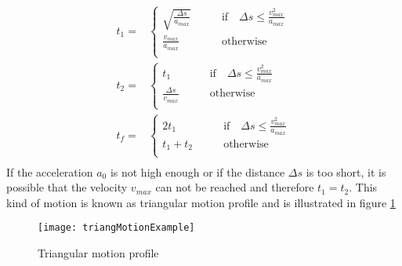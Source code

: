 \documentclass[a4paper, 11pt]{article}
\begin{document}
\newpage
\begin{equation}
\label{t1t2tf}
\begin{split}
t_1 =
&\begin{cases}
\sqrt{\frac{\Delta s}{a_{max}}}  \qquad &\textrm{if} \quad \Delta s \leq \frac{v_{max}^2}{a_{max}}\\[10pt]
\frac{v_{max}}{a_{max}}  \qquad &\textrm{otherwise} \\
\end{cases}\\
t_2 =
&\begin{cases}
t_1  \qquad &\textrm{if} \quad \Delta s \leq \frac{v_{max}^2}{a_{max}}\\[10pt]
\frac{\Delta s}{v_{max}}  \qquad &\textrm{otherwise} \\
\end{cases}\\
t_f =
&\begin{cases}
2t_1  \qquad &\textrm{if} \quad \Delta s \leq \frac{v_{max}^2}{a_{max}}\\[10pt]
t_1 + t_2   \qquad &\textrm{otherwise} \\
\end{cases}\\
\end{split}
\end{equation}
If the acceleration $a_0$ is not high enough or if the distance $\Delta s$ is too short, it is possible that the velocity $v_{max}$ can not be reached and therefore $t_1=t_2$. This kind of motion is known as triangular motion profile and is illustrated in figure \ref{fig:triangMotionExample}
\begin{figure}[H]
	\centering
	\texttt{[image: triangMotionExample]}
	\caption{Triangular motion profile}	
	\label{fig:triangMotionExample}	
\end{figure}
\noindent
\end{document}
